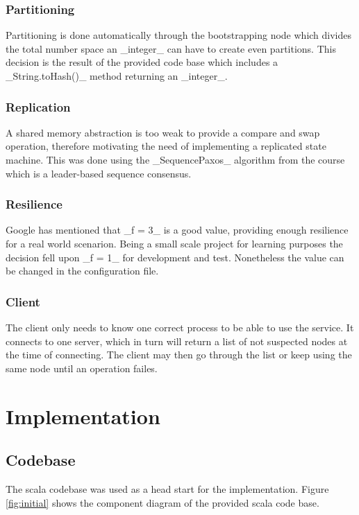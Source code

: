 \documentclass[a4paper]{scrartcl}
\begin{document}
\subsubsection{Partitioning}
Partitioning is done automatically through the bootstrapping node which divides the total number space an _integer_ can have to create even partitions. 
This decision is the result of the provided code base which includes a _String.toHash()_ method returning an _integer_.

\subsubsection{Replication}
A shared memory abstraction is too weak to provide a compare and swap operation, therefore motivating the need of implementing a replicated state machine.
This was done using the _SequencePaxos_ algorithm from the course which is a leader-based sequence consensus.

\subsubsection{Resilience}
Google has mentioned that  _f = 3_ is a good value, providing enough resilience for a real world scenarion.
Being a small scale project for learning purposes the decision fell upon _f = 1_ for development and test.
Nonetheless the value can be changed in the configuration file.

\subsubsection{Client}
The client only needs to know one correct process to be able to use the service.
It connects to one server, which in turn will return a list of not suspected nodes at the time of connecting.
The client may then go through the list or keep using the same node until an operation failes.




\section{Implementation}

\subsection{Codebase}
The scala codebase was used as a head start for the implementation.
Figure \ref{fig:initial} shows the component diagram of the provided scala code base. 
\end{document}
